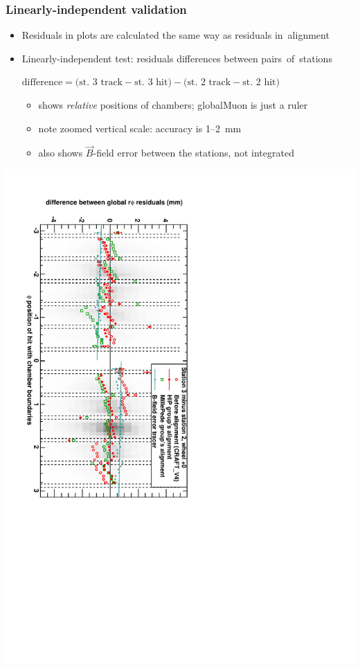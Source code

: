 \documentclass[compress]{beamer}
\begin{document}
\begin{frame}
\frametitle{Linearly-independent validation}

\begin{itemize}
\item Residuals in plots are calculated the same way as residuals \mbox{in alignment\hspace{-1 cm}}
\item Linearly-independent test: residuals differences between
  \mbox{pairs of stations\hspace{-1 cm}}

\mbox{$\mbox{difference} = \big(\mbox{st.\ 3 track} - \mbox{st.\ 3 hit}\big) - \big(\mbox{st.\ 2 track} - \mbox{st.\ 2 hit}\big)$}

\begin{itemize}\setlength{\itemsep}{0.1 cm}
\item shows {\it relative} positions of chambers; globalMuon is just a ruler
\item note zoomed vertical scale: accuracy is 1--2~mm
\item also shows $\vec{B}$-field error between the stations, not integrated
\end{itemize}
\end{itemize}

\vspace{-0.4 cm}
\begin{center}
\includegraphics[height=0.95\linewidth, angle=90]{DTrphidiff23VsPhi_whC.pdf}
\end{center}
\end{frame}
\end{document}
